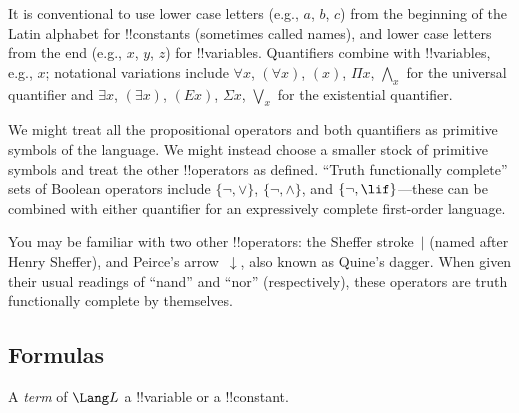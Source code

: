 \documentclass[../../../../include/open-logic-section]{subfiles}
\begin{document}
    It is conventional to use lower case letters (e.g., $a$, $b$, $c$) from
    the beginning of the Latin alphabet for !!{constant}s (sometimes called
    names), and lower case letters from the end (e.g., $x$, $y$, $z$) for
    !!{variable}s. Quantifiers combine with !!{variable}s, e.g., $x$;
    notational variations include $\forall x$, $(\forall x)$, $(x)$, $\Pi x$,
    $\bigwedge_x$ for the universal quantifier and $\exists x$, $(\exists
    x)$, $(Ex)$, $\Sigma x$, $\bigvee_x$ for the existential quantifier.
    
    We might treat all the propositional operators and both quantifiers as
    primitive symbols of the language.  We might instead choose a smaller
    stock of primitive symbols and treat the other !!{operator}s as
    defined. ``Truth functionally complete'' sets of Boolean operators
    include $\{ \lnot, \lor \}$, $\{ \lnot, \land \}$, and $\{ \lnot,
    \lif\}$---these can be combined with either quantifier for an
    expressively complete first-order language.
    
    You may be familiar with two other !!{operator}s: the Sheffer
    stroke~$|$ (named after Henry Sheffer), and Peirce's
    arrow~$\downarrow$, also known as Quine's dagger.  When given their
    usual readings of ``nand'' and ``nor'' (respectively), these operators
    are truth functionally complete by themselves.

\subsection{Formulas}

A \emph{term} of $\Lang L$ a !!{variable} or a !!{constant}. 
    
\end{document}
